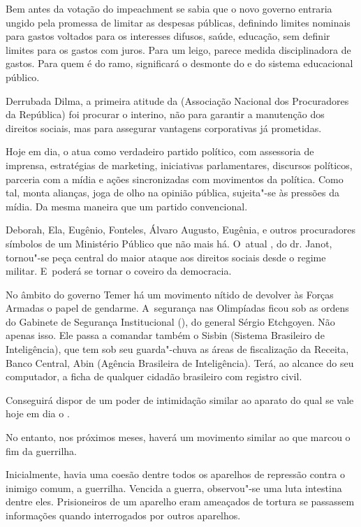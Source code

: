 Bem antes da votação do impeachment se sabia que o novo governo entraria
ungido pela promessa de limitar as despesas públicas, definindo limites
nominais para gastos voltados para os interesses difusos, saúde,
educação, sem definir limites para os gastos com juros. Para um leigo,
parece medida disciplinadora de gastos. Para quem é do ramo, significará
o desmonte do  e do sistema educacional público.

Derrubada Dilma, a primeira atitude da  (Associação Nacional dos
Procuradores da República) foi procurar o interino, não para garantir a
manutenção dos direitos sociais, mas para assegurar vantagens
corporativas já prometidas.

Hoje em dia, o  atua como verdadeiro partido político, com assessoria
de imprensa, estratégias de marketing, iniciativas parlamentares,
discursos políticos, parceria com a mídia e ações sincronizadas com
movimentos da política. Como tal, monta alianças, joga de olho na
opinião pública, sujeita"-se às pressões da mídia. Da mesma maneira que
um partido convencional.

Deborah, Ela, Eugênio, Fonteles, Álvaro Augusto, Eugênia, e outros
procuradores símbolos de um Ministério Público que não mais há. O~atual
, do dr. Janot, tornou"-se peça central do maior ataque aos direitos
sociais desde o regime militar. E~poderá se tornar o coveiro da
democracia.

No âmbito do governo Temer há um movimento nítido de devolver às Forças
Armadas o papel de gendarme. A~segurança nas Olimpíadas ficou sob as
ordens do Gabinete de Segurança Institucional (), do general Sérgio
Etchgoyen. Não apenas isso. Ele passa a comandar também o Sisbin
(Sistema Brasileiro de Inteligência), que tem sob seu guarda"-chuva as
áreas de fiscalização da Receita, Banco Central, Abin (Agência
Brasileira de Inteligência). Terá, ao alcance do seu computador, a ficha
de qualquer cidadão brasileiro com registro civil.

Conseguirá dispor de um poder de intimidação similar ao aparato do qual
se vale hoje em dia o .

No entanto, nos próximos meses, haverá um movimento similar ao que
marcou o fim da guerrilha.

Inicialmente, havia uma coesão dentre todos os aparelhos de repressão
contra o inimigo comum, a guerrilha. Vencida a guerra, observou"-se uma
luta intestina dentre eles. Prisioneiros de um aparelho eram ameaçados
de tortura se passassem informações quando interrogados por outros
aparelhos.

